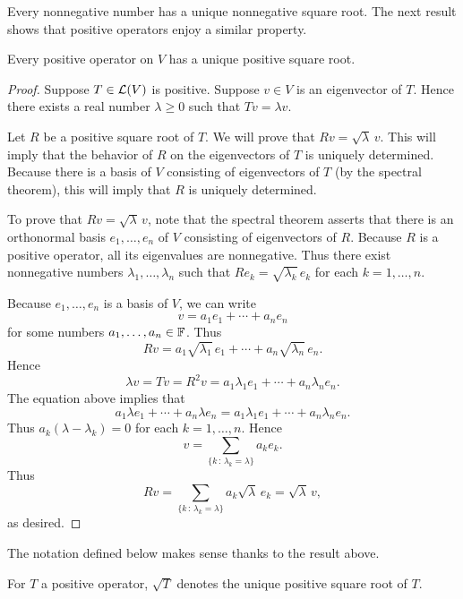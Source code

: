 Every nonnegative number has a unique nonnegative square root. The next result
shows that positive operators enjoy a similar property.

\begin{result}\label{ax:7.39}
Every positive operator on $V$ has a unique positive square root.
\end{result}

\begin{proof}
Suppose $T\in\mathcal{L}(V)$ is positive. Suppose $v\in V$ is an eigenvector of $T$.
Hence there exists a real number $\lambda\ge0$ such that $Tv=\lambda v$.

Let $R$ be a positive square root of $T$. We will prove that
$Rv=\sqrt{\lambda}\,v$. This will imply that the behavior of $R$ on the
eigenvectors of $T$ is uniquely determined. Because there is a basis of $V$
consisting of eigenvectors of $T$ (by the spectral theorem), this will imply
that $R$ is uniquely determined.

%

To prove that $Rv=\sqrt{\lambda}\,v$, note that the spectral theorem asserts that
there is an orthonormal basis $e_1,\dots,e_n$ of $V$ consisting of eigenvectors
of $R$. Because $R$ is a positive operator, all its eigenvalues are nonnegative.
Thus there exist nonnegative numbers $\lambda_1,\dots,\lambda_n$ such that
$Re_k=\sqrt{\lambda_k}\,e_k$ for each $k=1,\dots,n$.

Because $e_1,\dots,e_n$ is a basis of $V$, we can write
\[ v=a_1e_1+\cdots+a_ne_n \]
for some numbers $a_1,\dots,a_n\in\mathbb{F}$. Thus
\[ Rv=a_1\sqrt{\lambda_1}\,e_1+\cdots+a_n\sqrt{\lambda_n}\,e_n. \]
Hence
\[ \lambda v=Tv=R^2v=a_1\lambda_1e_1+\cdots+a_n\lambda_ne_n. \]
The equation above implies that
\[ a_1\lambda e_1+\cdots+a_n\lambda e_n=a_1\lambda_1e_1+\cdots+a_n\lambda_ne_n. \]
Thus $a_k(\lambda-\lambda_k)=0$ for each $k=1,\dots,n$. Hence
\[ v=\sum_{\{k\,:\,\lambda_k=\lambda\}}a_ke_k. \]
Thus
\[ Rv=\sum_{\{k\,:\,\lambda_k=\lambda\}}a_k\sqrt{\lambda}\,e_k=\sqrt{\lambda}\,v, \]
as desired.
\end{proof}

The notation defined below makes sense thanks to the result above.

\begin{notation}[$\sqrt{T}$]\label{ax:7.40}
For $T$ a positive operator, $\sqrt{T}$ denotes the unique positive square root
of $T$.
\end{notation}

